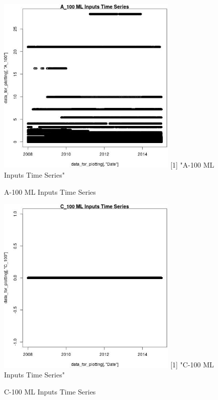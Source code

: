 \begin{figure} 
\centering  
\includegraphics[width=0.77\textwidth]{Code_Outputs/ML_input_report_ML_input_PM25_Step5_part_d_de_duplicated_aves_ML_input_A_100TS.jpg} 
[1] "A-100 ML Inputs Time Series"
\caption{\label{fig:ML_input_report_ML_input_PM25_Step5_part_d_de_duplicated_aves_ML_inputA_100TS}A-100 ML Inputs Time Series} 
\end{figure} 
 

\begin{figure} 
\centering  
\includegraphics[width=0.77\textwidth]{Code_Outputs/ML_input_report_ML_input_PM25_Step5_part_d_de_duplicated_aves_ML_input_C_100TS.jpg} 
[1] "C-100 ML Inputs Time Series"
\caption{\label{fig:ML_input_report_ML_input_PM25_Step5_part_d_de_duplicated_aves_ML_inputC_100TS}C-100 ML Inputs Time Series} 
\end{figure} 
 

